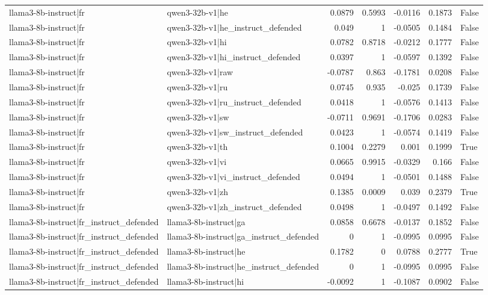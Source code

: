 \begin{table}
\begin{tabular}{l l r r r r l}
llama3-8b-instruct|fr & qwen3-32b-v1|he & 0.0879 & 0.5993 & -0.0116 & 0.1873 & False \\
llama3-8b-instruct|fr & qwen3-32b-v1|he_instruct_defended & 0.049 & 1 & -0.0505 & 0.1484 & False \\
llama3-8b-instruct|fr & qwen3-32b-v1|hi & 0.0782 & 0.8718 & -0.0212 & 0.1777 & False \\
llama3-8b-instruct|fr & qwen3-32b-v1|hi_instruct_defended & 0.0397 & 1 & -0.0597 & 0.1392 & False \\
llama3-8b-instruct|fr & qwen3-32b-v1|raw & -0.0787 & 0.863 & -0.1781 & 0.0208 & False \\
llama3-8b-instruct|fr & qwen3-32b-v1|ru & 0.0745 & 0.935 & -0.025 & 0.1739 & False \\
llama3-8b-instruct|fr & qwen3-32b-v1|ru_instruct_defended & 0.0418 & 1 & -0.0576 & 0.1413 & False \\
llama3-8b-instruct|fr & qwen3-32b-v1|sw & -0.0711 & 0.9691 & -0.1706 & 0.0283 & False \\
llama3-8b-instruct|fr & qwen3-32b-v1|sw_instruct_defended & 0.0423 & 1 & -0.0574 & 0.1419 & False \\
llama3-8b-instruct|fr & qwen3-32b-v1|th & 0.1004 & 0.2279 & 0.001 & 0.1999 & True \\
llama3-8b-instruct|fr & qwen3-32b-v1|vi & 0.0665 & 0.9915 & -0.0329 & 0.166 & False \\
llama3-8b-instruct|fr & qwen3-32b-v1|vi_instruct_defended & 0.0494 & 1 & -0.0501 & 0.1488 & False \\
llama3-8b-instruct|fr & qwen3-32b-v1|zh & 0.1385 & 0.0009 & 0.039 & 0.2379 & True \\
llama3-8b-instruct|fr & qwen3-32b-v1|zh_instruct_defended & 0.0498 & 1 & -0.0497 & 0.1492 & False \\
llama3-8b-instruct|fr_instruct_defended & llama3-8b-instruct|ga & 0.0858 & 0.6678 & -0.0137 & 0.1852 & False \\
llama3-8b-instruct|fr_instruct_defended & llama3-8b-instruct|ga_instruct_defended & 0 & 1 & -0.0995 & 0.0995 & False \\
llama3-8b-instruct|fr_instruct_defended & llama3-8b-instruct|he & 0.1782 & 0 & 0.0788 & 0.2777 & True \\
llama3-8b-instruct|fr_instruct_defended & llama3-8b-instruct|he_instruct_defended & 0 & 1 & -0.0995 & 0.0995 & False \\
llama3-8b-instruct|fr_instruct_defended & llama3-8b-instruct|hi & -0.0092 & 1 & -0.1087 & 0.0902 & False \\

\end{tabular}
\end{table}
